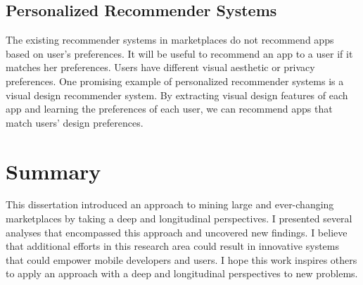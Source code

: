 \subsection*{Personalized Recommender Systems}
The existing recommender systems in marketplaces do not recommend apps based on user's preferences.
It will be useful to recommend an app to a user if it matches her preferences.
Users have different visual aesthetic or privacy preferences.
One promising example of personalized recommender systems is a visual design recommender system.
By extracting visual design features of each app and learning the preferences of each user, we can recommend apps that match users' design preferences.

\section{Summary}
This dissertation introduced an approach to mining large and ever-changing marketplaces by taking a deep and longitudinal perspectives.
I presented several analyses that encompassed this approach and uncovered new findings.
I believe that additional efforts in this research area could result in innovative systems that could empower mobile developers and users.
I hope this work inspires others to apply an approach with a deep and longitudinal perspectives to new problems.